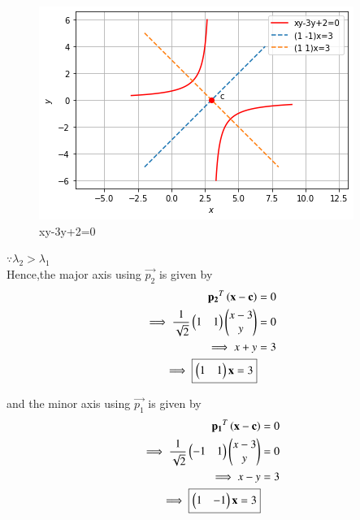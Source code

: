 \begin{enumerate}
    
    \begin{figure}[!ht]
    \centering
    \includegraphics[width=\columnwidth]{app/2/Figures/ChallengeProblem5_5.png}
    \caption{xy-3y+2=0}
    \label{quadforms/app/2/ex5}	
    \end{figure}
    
    $\because \lambda_2>\lambda_1$ \\
    Hence,the major axis using $\vec{p_2}$ is given by
    \begin{align}
        \mathbf{p_2}^T\left(\mathbf{x}-\mathbf{c}\right) &= 0 \\
        \implies \frac{1}{\sqrt{2}}\begin{pmatrix}1 & 1\end{pmatrix}\begin{pmatrix}x-3 \\ y\end{pmatrix} &= 0 \\
        \implies x+y &= 3 \\
        \implies \boxed{\begin{pmatrix}1 & 1\end{pmatrix}\mathbf{x} =3}
    \end{align}
    
    and the minor axis using $\vec{p_1}$ is given by
    \begin{align}
        \mathbf{p_1}^T\left(\mathbf{x}-\mathbf{c}\right) &= 0 \\
        \implies \frac{1}{\sqrt{2}}\begin{pmatrix}-1 & 1\end{pmatrix}\begin{pmatrix}x-3 \\ y\end{pmatrix} &= 0 \\
        \implies x-y &= 3 \\
        \implies \boxed{\begin{pmatrix}1 & -1\end{pmatrix}\mathbf{x} =3}
    \end{align}
    
\end{enumerate}



